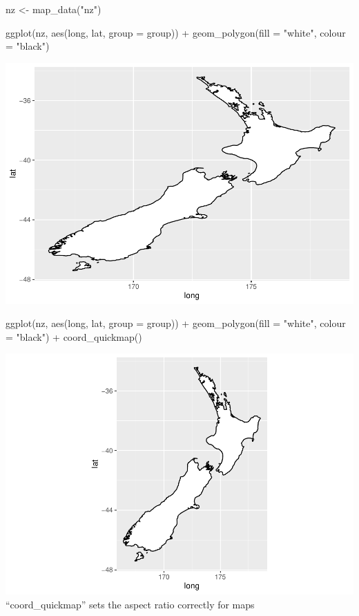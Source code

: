 \documentclass[
]{article}
\newenvironment{Shaded}{\begin{snugshade}}{\end{snugshade}}
\newcommand{\AttributeTok}[1]{\textcolor[rgb]{0.77,0.63,0.00}{#1}}
\newcommand{\FunctionTok}[1]{\textcolor[rgb]{0.00,0.00,0.00}{#1}}
\newcommand{\NormalTok}[1]{#1}
\newcommand{\OtherTok}[1]{\textcolor[rgb]{0.56,0.35,0.01}{#1}}
\newcommand{\SpecialCharTok}[1]{\textcolor[rgb]{0.00,0.00,0.00}{#1}}
\newcommand{\StringTok}[1]{\textcolor[rgb]{0.31,0.60,0.02}{#1}}
\begin{document}
\begin{Shaded}
\begin{Highlighting}[]
\NormalTok{nz }\OtherTok{\textless{}{-}} \FunctionTok{map\_data}\NormalTok{(}\StringTok{"nz"}\NormalTok{)}

\FunctionTok{ggplot}\NormalTok{(nz, }\FunctionTok{aes}\NormalTok{(long, lat, }\AttributeTok{group =}\NormalTok{ group)) }\SpecialCharTok{+}
  \FunctionTok{geom\_polygon}\NormalTok{(}\AttributeTok{fill =} \StringTok{"white"}\NormalTok{, }\AttributeTok{colour =} \StringTok{"black"}\NormalTok{)}
\end{Highlighting}
\end{Shaded}

\includegraphics{Assignments_files/figure-latex/unnamed-chunk-54-1.pdf}

\begin{Shaded}
\begin{Highlighting}[]
\FunctionTok{ggplot}\NormalTok{(nz, }\FunctionTok{aes}\NormalTok{(long, lat, }\AttributeTok{group =}\NormalTok{ group)) }\SpecialCharTok{+}
  \FunctionTok{geom\_polygon}\NormalTok{(}\AttributeTok{fill =} \StringTok{"white"}\NormalTok{, }\AttributeTok{colour =} \StringTok{"black"}\NormalTok{) }\SpecialCharTok{+}
  \FunctionTok{coord\_quickmap}\NormalTok{()}
\end{Highlighting}
\end{Shaded}

\includegraphics{Assignments_files/figure-latex/unnamed-chunk-54-2.pdf}
``coord\_quickmap'' sets the aspect ratio correctly for maps
\end{document}
